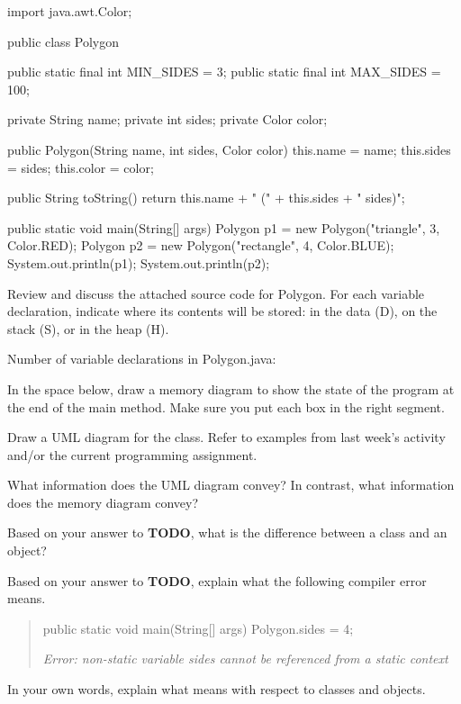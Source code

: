 

\begin{javalst}
import java.awt.Color;

public class Polygon {
    
    public static final int MIN_SIDES = 3;
    public static final int MAX_SIDES = 100;
    
    private String name;
    private int sides;
    private Color color;
    
    public Polygon(String name, int sides, Color color) {
        this.name = name;
        this.sides = sides;
        this.color = color;
    }
    
    public String toString() {
        return this.name + " (" + this.sides + " sides)";
    }
    
    public static void main(String[] args) {
        Polygon p1 = new Polygon("triangle", 3, Color.RED);
        Polygon p2 = new Polygon("rectangle", 4, Color.BLUE);
        System.out.println(p1);
        System.out.println(p2);
    }
    
}
\end{javalst}


\Q Review and discuss the attached source code for Polygon.
For each variable declaration, indicate where its contents will be stored: in the data (D), on the stack (S), or in the heap (H).

\begin{center}
Number of variable declarations in Polygon.java: \blank
\end{center}

\Q In the space below, draw a memory diagram to show the state of the  program at the end of the main method.
Make sure you put each box in the right segment.

\Q Draw a UML diagram for the  class.
Refer to examples from last week's activity and/or the current programming assignment.

\Q What information does the UML diagram convey?
In contrast, what information does the memory diagram convey?

\Q Based on your answer to \textbf{TODO}, what is the difference between a class and an object?

\Q Based on your answer to \textbf{TODO}, explain what the following compiler error means.

\begin{quote}
\begin{javalst}
public static void main(String[] args) {
    Polygon.sides = 4;
}
\end{javalst}

\it Error: non-static variable sides cannot be referenced from a static context
\end{quote}

\Q In your own words, explain what  means with respect to classes and objects.

